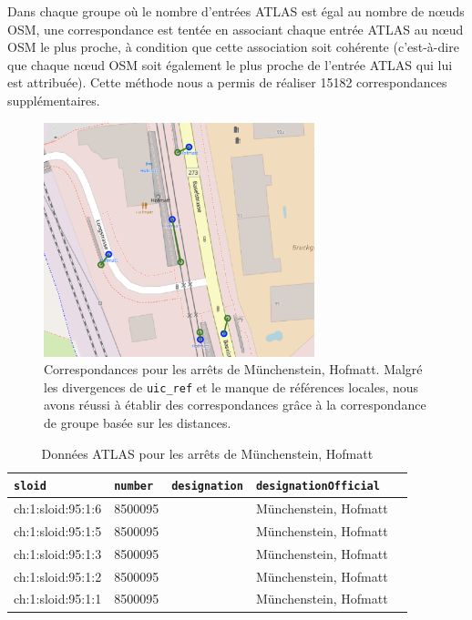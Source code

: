 Dans chaque groupe où le nombre d'entrées ATLAS est égal au nombre de nœuds OSM, une correspondance est tentée en associant chaque entrée ATLAS au nœud OSM le plus proche, à condition que cette association soit cohérente (c'est-à-dire que chaque nœud OSM soit également le plus proche de l'entrée ATLAS qui lui est attribuée). Cette méthode nous a permis de réaliser 15182 correspondances supplémentaires.

\begin{figure}[h] 
    \centering
    \includegraphics[width=0.7\textwidth]{../figures/correspondances/groupe_proximite.png}
    \caption[Correspondances – Münchenstein, Hofmatt]{Correspondances pour les arrêts de Münchenstein, Hofmatt. Malgré les divergences de \texttt{uic\_ref} et le manque de références locales, nous avons réussi à établir des correspondances grâce à la correspondance de groupe basée sur les distances.}
    \label{fig:group_proximity_munchenstein}
\end{figure}

\FloatBarrier

\begin{table}
\caption[Données ATLAS – Münchenstein, Hofmatt]{Données ATLAS pour les arrêts de Münchenstein, Hofmatt}
\label{tab:atlas_data}
\centering
\begin{tabular}{l l l l l}
\toprule
\texttt{sloid} & \texttt{number} & \texttt{designation} & \texttt{designationOfficial} \\
\midrule
ch:1:sloid:95:1:6 & 8500095 &  & Münchenstein, Hofmatt \\
ch:1:sloid:95:1:5 & 8500095 &  & Münchenstein, Hofmatt \\
ch:1:sloid:95:1:3 & 8500095 &  & Münchenstein, Hofmatt \\
ch:1:sloid:95:1:2 & 8500095 &  & Münchenstein, Hofmatt \\
ch:1:sloid:95:1:1 & 8500095 &  & Münchenstein, Hofmatt \\
\bottomrule
\end{tabular}
\end{table}

